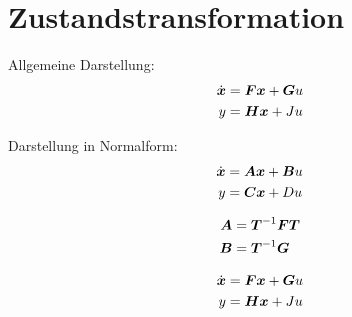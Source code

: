 \section{Zustandstransformation}

\begin{tcolorbox}[colback=white!10!white,colframe=green!60!black,title=Definition + Umrechnung]
\begin{minipage}{.45\textwidth}
	Allgemeine Darstellung:
	\begin{align*}
	\dot{\boldsymbol{x}} &= \boldsymbol{Fx} + \boldsymbol{G}u\\
	y &= \boldsymbol{Hx} +Ju
	\end{align*}
\end{minipage}
\begin{minipage}{.45\textwidth}
Darstellung in Normalform:
\begin{align*}
\dot{\boldsymbol{x}} &= \boldsymbol{Ax} + \boldsymbol{B}u\\
y &= \boldsymbol{Cx} +Du
\end{align*}
\end{minipage}
\tcblower
\begin{minipage}{.45\textwidth}
	\begin{align*}
	\boldsymbol{A} &= \boldsymbol{T}^{-1}\boldsymbol{F}\boldsymbol{T}\\
 \boldsymbol{B} &= \boldsymbol{T}^{-1}\boldsymbol{G}
	\end{align*}
\end{minipage}
\begin{minipage}{.45\textwidth}
	\begin{align*}
		\dot{\boldsymbol{x}} &= \boldsymbol{Fx} + \boldsymbol{G}u\\
		y &= \boldsymbol{Hx} +Ju
	\end{align*}
\end{minipage}

\end{tcolorbox}



 


